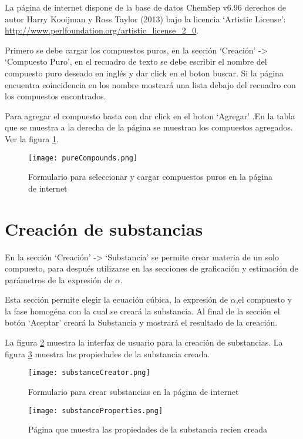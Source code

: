 	La página de internet dispone de la base de datos ChemSep v6.96 derechos de autor  Harry Kooijman y Ross Taylor (2013) bajo la licencia `Artistic License': \url{ http://www.perlfoundation.org/artistic_license_2_0}.

	Primero se debe cargar los compuestos puros, en la sección `Creación' -> `Compuesto Puro', en el recuadro de texto se debe escribir el nombre del compuesto puro deseado en inglés y dar click en el boton buscar. Si la página encuentra coincidencia en los nombre mostrará una lista debajo del recuadro con los compuestos encontrados.

	Para agregar el compuesto basta con dar click en el boton `Agregar' .En la tabla que se muestra a la derecha de la página se muestran los compuestos agregados. Ver la figura \ref{fig:pureCompounds}.

	\begin{figure}
		\texttt{[image: pureCompounds.png]}
		\caption{Formulario para seleccionar y cargar compuestos puros en la página de internet}
		\label{fig:pureCompounds}
	\end{figure}

\section{Creación de substancias}\label{sec:webSubstanceCreator}
	
	En la sección `Creación' -> `Substancia' se permite crear materia de un solo compuesto, para después utilizarse en las secciones de graficación y estimación de parámetros de la expresión de $\alpha$.

	Esta sección permite elegir la ecuación cúbica, la expresión de $\alpha$,el compuesto y la fase homogéna con la cual se creará la substancia. Al final de la sección el botón `Aceptar' creará la Substancia y mostrará el resultado de la creación.

	La figura \ref{fig:substanceCreator} muestra la interfaz de usuario para la creación de substancias. La figura \ref{fig:substanceProperties} muestra las propiedades de la substancia creada.

	\begin{figure}
		\texttt{[image: substanceCreator.png]}
		\caption{Formulario para crear substancias en la página de internet}
		\label{fig:substanceCreator}
	\end{figure}

	\begin{figure}
		\texttt{[image: substanceProperties.png]}
		\caption{Página que muestra las propiedades de la substancia recien creada}
		\label{fig:substanceProperties}
	\end{figure}

